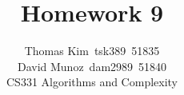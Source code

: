 \documentclass[12pt]{article}
\begin{document}
\title{Homework 9}
\author{Thomas Kim~tsk389~51835\\David Munoz~dam2989~51840\\
CS331 Algorithms and Complexity}

\renewcommand{\arraystretch}{2.0}

\date{} %


\maketitle

\onecolumn







\end{document}
